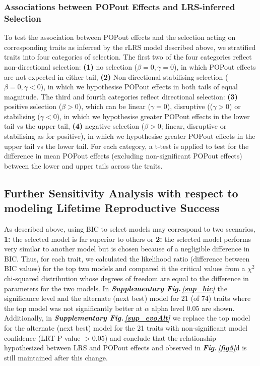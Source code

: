 \documentclass[12pt]{zHenriquesLab-StyleBioRxiv}
\newcommand\fref[1]{\normalsize{\textbf{\textit{Fig.\,\ref{#1}}}}\normalsize{}}
\newcommand\sref[1]{\normalsize{\textbf{\textit{Supplementary Fig.\,\ref{#1}}}}\normalsize{}}
\begin{document}
{{%
\subsubsection*{Associations between POPout Effects and LRS-inferred Selection}
To test the association between POPout effects and the selection acting on 
corresponding traits as inferred by the rLRS model described above, we stratified 
traits into four categories of selection. The first two of the four categories reflect non-directional 
selection: \textbf{(1)} no selection ($\beta=0,\gamma=0$), in which POPout 
effects are not expected in either tail, \textbf{(2)} Non-directional stabilising 
selection ($\beta=0,\gamma<0$), in which we hypothesise POPout effects 
in both tails of equal magnitude. The third and fourth categories reflect directional selection: 
\textbf{(3)} positive selection ($\beta>0$), which can be linear ($\gamma=0$), disruptive 
(($\gamma>0$) or stabilising ($\gamma<0$), in which we hypothesise greater 
POPout effects in the lower tail vs the upper tail, \textbf{(4)} negative 
selection ($\beta>0$; linear, disruptive or stabilising as for positive), in which we 
hypothesise greater POPout effects in the upper tail vs the lower tail. For each category, 
a t-test is applied to test for the difference in mean POPout effects (excluding non-significant 
POPout effects) between the lower and upper tails across the traits.


{\color{blue}

\subsection*{Further Sensitivity Analysis with respect to modeling Lifetime Reproductive Success} 

As described above, using BIC to select models may correspond to two scenarios, \textbf{1:} the 
selected model is far superior to others or \textbf{2:} the selected model performs very similar to 
another model but is chosen because of a negligible difference in BIC.  Thus, for each trait, 
we calculated the likelihood ratio (difference between BIC values) for the top two models 
and compared it the critical values from a $\chi^2$ chi-squared distribution whose degrees of freedom 
are equal to the difference in parameters for the two models.  In \sref{sup_bic} the  
significance level and the alternate (next best) model for 21 (of 74) traits where the top model was not 
significantly better at $\alpha$ alpha level 0.05 are shown.  Additionally, in \sref{sup_evoAlt} we replace
the top model for the alternate (next best) model for the 21 traits with non-significant model confidence 
(LRT P-value $>0.05$) and conclude that the relationship hypothesized between LRS and POPout effects and 
observed in \fref{fig5}{d} is still maintained after this change. 
}

}}
\end{document}
